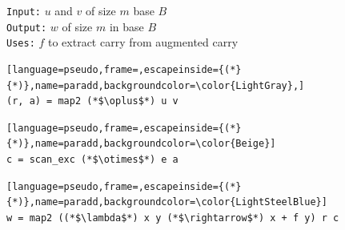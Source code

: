 \begin{figure}
  \centering
  \begin{minipage}{0.47\textwidth}
    \footnotesize
    \texttt{Input:} $u$ and $v$ of size $m$ base $B$\\
    \texttt{Output:} $w$ of size $m$ in base $B$\\
    \texttt{Uses:} $f$ to extract carry from augmented carry
\begin{lstlisting}[language=pseudo,frame=,escapeinside={(*}{*)},name=paradd,backgroundcolor=\color{LightGray},]
(r, a) = map2 (*$\oplus$*) u v
\end{lstlisting}
\vspace{-\baselineskip}
\begin{lstlisting}[language=pseudo,frame=,escapeinside={(*}{*)},name=paradd,backgroundcolor=\color{Beige}]
c = scan_exc (*$\otimes$*) e a
\end{lstlisting}
\vspace{-\baselineskip}
\begin{lstlisting}[language=pseudo,frame=,escapeinside={(*}{*)},name=paradd,backgroundcolor=\color{LightSteelBlue}]
w = map2 ((*$\lambda$*) x y (*$\rightarrow$*) x + f y) r c
\end{lstlisting}
\end{minipage}
  \noindent{}
\end{figure}
